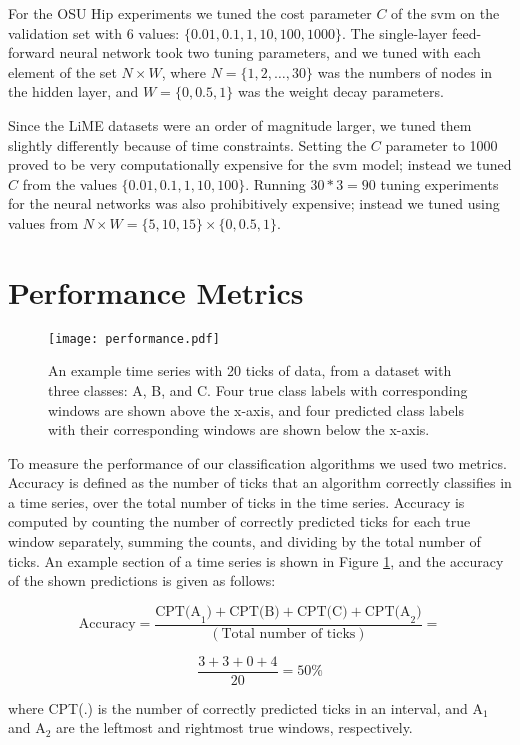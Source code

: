 For the OSU Hip experiments we tuned the
cost parameter $C$ of the svm on the validation set with 6 values:
$\{0.01,0.1,1,10,100,1000\}$. The single-layer feed-forward neural network took
two tuning parameters, and we tuned with each element of the set $N \times W$,
where $N = \{1,2, \ldots, 30\}$ was the numbers of nodes in the hidden layer, and 
$W = \{0,0.5,1\}$ was the weight decay parameters.

Since the LiME datasets were an order of magnitude larger, we tuned them
slightly differently because of time constraints. Setting the $C$ parameter to
1000 proved to be very computationally expensive for the svm model; instead we tuned $C$
from the values $\{0.01,0.1,1,10,100\}$. Running $30*3=90$ tuning experiments
for the neural networks was also prohibitively expensive; instead we tuned using
values from $N \times W = \{5,10,15\} \times \{0,0.5,1\}$.




\section{Performance Metrics}
\begin{figure}[h]
 \centering
 \texttt{[image: performance.pdf]}
 \caption{An example time series with 20 ticks of data, from a dataset with
  three classes: A, B, and C. Four true class labels with
  corresponding windows are shown above the x-axis, and four predicted class
  labels with their corresponding windows are shown below the x-axis.}
 \label{fig:performance}
\end{figure}

To measure the performance of our classification algorithms we used
two metrics. Accuracy is defined as the number of ticks that an algorithm
correctly classifies in a time series, over the total number of ticks
in the time series. Accuracy is computed by counting the number of
correctly predicted ticks for each true window separately, summing the counts,
and dividing by the total number of ticks. An example section of a time series
is shown in Figure \ref{fig:performance}, and the accuracy of the shown
predictions is given as follows:

\[
\text{Accuracy} = \frac{\text{CPT(A}_1) + \text{CPT(B)} + \text{CPT(C)} + \text{CPT(A}_2)}{(\text{Total number of ticks})} =
\]

\[
\frac{3 + 3 + 0 + 4}{20} = 50\%
\]

where CPT(.) is the number of correctly predicted ticks in an interval, and
A$_1$ and A$_2$ are the leftmost and rightmost true windows, respectively.

